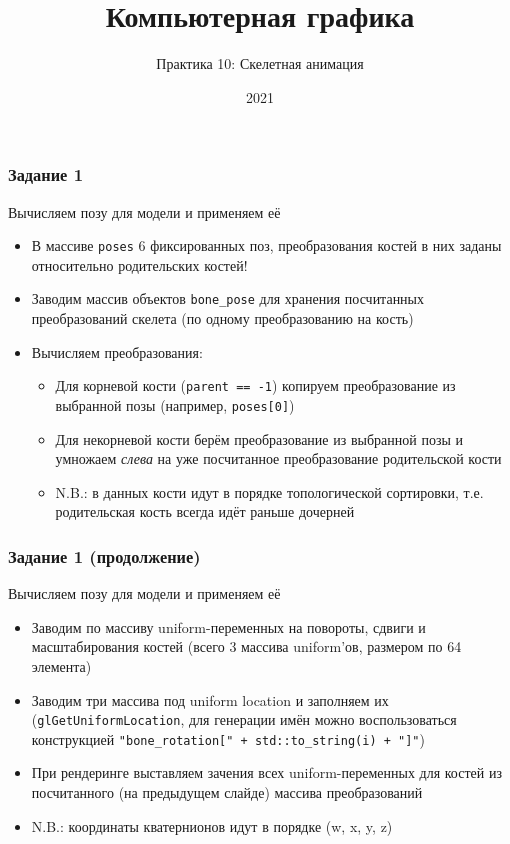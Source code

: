 \documentclass{beamer}
\title{Компьютерная графика}
\subtitle{Практика 10: Скелетная анимация}
\date{2021}
\begin{document}
\frame{\titlepage}

\begin{frame}[fragile]
\frametitle{Задание 1}
Вычисляем позу для модели и применяем её
\begin{itemize}
\item В массиве \verb|poses| 6 фиксированных поз, преобразования костей в них заданы относительно родительских костей!
\pause
\item Заводим массив объектов \verb|bone_pose| для хранения посчитанных преобразований скелета (по одному преобразованию на кость)
\pause
\item Вычисляем преобразования:
\begin{itemize}
\item Для корневой кости (\verb|parent == -1|) копируем преобразование из выбранной позы (например, \verb|poses[0]|)
\item Для некорневой кости берём преобразование из выбранной позы и умножаем \textit{слева} на уже посчитанное преобразование родительской кости
\item N.B.: в данных кости идут в порядке топологической сортировки, т.е. родительская кость всегда идёт раньше дочерней
\end{itemize}
\end{itemize}
\end{frame}

\begin{frame}[fragile]
\frametitle{Задание 1 (продолжение)}
Вычисляем позу для модели и применяем её
\begin{itemize}
\item Заводим по массиву uniform-переменных на повороты, сдвиги и масштабирования костей (всего 3 массива uniform'ов, размером по 64 элемента)
\pause
\item Заводим три массива под uniform location и заполняем их (\verb|glGetUniformLocation|, для генерации имён можно воспользоваться конструкцией \verb|"bone_rotation[" + std::to_string(i) + "]"|)
\pause
\item При рендеринге выставляем зачения всех uniform-переменных для костей из посчитанного (на предыдущем слайде) массива преобразований
\pause
\item N.B.: координаты кватернионов идут в порядке (w, x, y, z)
\end{itemize}
\end{frame}
\end{document}
